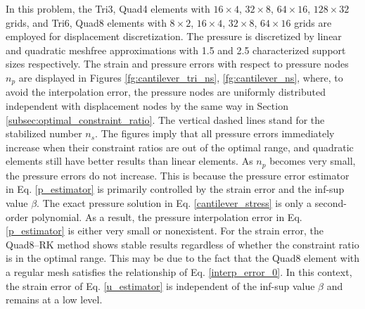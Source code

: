 In this problem, the Tri3, Quad4 elements with $16\times 4$, $32\times 8$, $64\times 16$, $128\times 32$ grids, and Tri6, Quad8 elements with $8\times 2$, $16\times 4$, $32\times 8$, $64\times 16$ grids are employed for displacement discretization. The pressure is discretized by linear and quadratic meshfree approximations with 1.5 and 2.5 characterized support sizes respectively.
The strain and pressure errors with respect to pressure nodes $n_p$ are displayed in Figures \ref{fg:cantilever_tri_ns}, \ref{fg:cantilever_ns}, where, to avoid the interpolation error, the pressure nodes are uniformly distributed independent with displacement nodes by the same way in Section \ref{subsec:optimal_constraint_ratio}. 
The vertical dashed lines stand for the stabilized number $n_s$.
The figures imply that all pressure errors immediately increase when their constraint ratios are out of the optimal range,
and quadratic elements still have better results than linear elements.
As $n_p$ becomes very small, the pressure errors do not increase.
This is because the pressure error estimator in Eq. \eqref{p_estimator} is primarily controlled by the strain error and the inf-sup value $\beta$.
The exact pressure solution in Eq. \eqref{cantilever_stress} is only a second-order polynomial. As a result, the pressure interpolation error in Eq. \eqref{p_estimator} is either very small or nonexistent.
For the strain error, the Quad8--RK method shows stable results regardless of whether the constraint ratio is in the optimal range.
This may be due to the fact that the Quad8 element with a regular mesh satisfies the relationship of Eq. \eqref{interp_error_0}.
In this context, the strain error of Eq. \eqref{u_estimator} is independent of the inf-sup value $\beta$ and remains at a low level.

